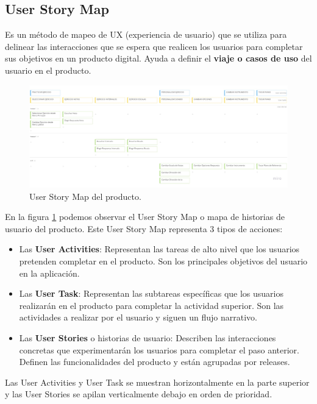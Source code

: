 \documentclass[12pt,twoside,titlepage]{report}
\begin{document}
\subsection{User Story Map}

Es un método de mapeo de UX (experiencia de usuario) que se utiliza para delinear las interacciones que se espera que realicen los usuarios para completar sus objetivos en un producto digital. Ayuda a definir el \textbf{viaje o casos de uso} del usuario en el producto.
\cite{userStoryMap1}
\cite{userStoryMap2}
\cite{userStoryMap3}

\begin{figure}[H]
    \centering
    \includegraphics[width=\textwidth]{Scrum/UserStoryMap}
    \caption{User Story Map del producto.}
    \label{fig:UserStoryMap}
\end{figure}

En la figura \ref{fig:UserStoryMap} podemos observar el User Story Map o mapa de historias de usuario del producto. Este User Story Map representa 3 tipos de acciones:
\begin{itemize}
    \item Las \textbf{User Activities}: Representan las tareas de alto nivel que los usuarios pretenden completar en el producto. Son los principales objetivos del usuario en la aplicación. 
    \item Las \textbf{User Task}: Representan las subtareas específicas que los usuarios realizarán en el producto para completar la actividad superior. Son las actividades a realizar por el usuario y siguen un flujo narrativo. 
    \item Las \textbf{User Stories} o historias de usuario: Describen las interacciones concretas que experimentarán los usuarios para completar el paso anterior. Definen las funcionalidades del producto y están agrupadas por releases.  
\end{itemize}

Las User Activities y User Task se muestran horizontalmente en la parte superior y las User Stories se apilan verticalmente debajo en orden de prioridad.
\end{document}
